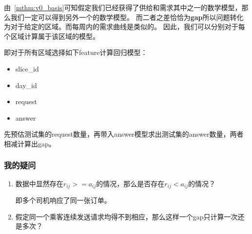 \documentclass[hyperref,UTF8]{ctexart}
\theoremstyle{definition}
\theoremstyle{remark}
\numberwithin{equation}{subsection}
\newcommand{\Emph}{\textbf}
\begin{document}
	由~\ref{mthm:v0_basis}可知假定我们已经获得了供给和需求其中之一的数学模型，那么我们一定可以得到另外一个的数学模型。
	而二者之差恰恰为\Emph{gap}所以问题转化为对于给定的区域。而每周内的需求曲线是类似的。
	因此，我们可以分别对于每个区域计算属于该区域的模型。
	
	即对于所有区域选择如下feature计算回归模型：
	\begin{itemize}
		\item slice\_id
		\item day\_id
		\item request
		\item answer
	\end{itemize}
	
	先预估测试集的request数量，再带入answer模型求出测试集的answer数量，两者相减计算出gap。
	
\subsubsection{我的疑问}

	\begin{enumerate}[(1)]
		
		\item 数据中显然存在$r_{ij} >= a_{ij}$的情况，那么是否存在$r_{ij} < a_{ij}$的情况？
		
		即多个司机响应了同一张订单。
		
		\item 假定同一个乘客连续发送请求均得不到相应，那么这样一个gap只计算一次还是多次？
		
	\end{enumerate}
	
	
\end{document}
